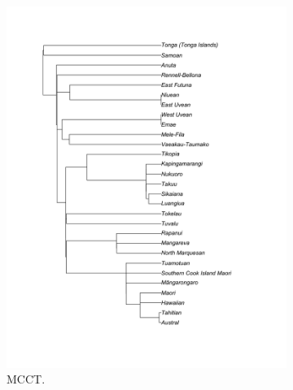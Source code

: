 \documentclass[12pt,letterpaper]{article}
\begin{document}
\begin{figure}[ht]
    \begin{subfigure}{0.3\linewidth}
          \includegraphics[width=\textwidth]{illustrations/plots_from_R/tree_plots/poly_tree_example_brlen_gray.png}
    \caption{\citet{grayetal_2009} MCCT.}
     \label{gray_tree_branch_example}
    \end{subfigure}
\hfil
    \begin{subfigure}{0.3\linewidth}

\end{subfigure}
\end{figure}
\end{document}
